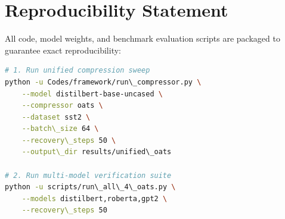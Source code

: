 \section{Reproducibility Statement}
All code, model weights, and benchmark evaluation scripts are packaged to guarantee exact reproducibility:
\begin{lstlisting}[language=bash]
# 1. Run unified compression sweep
python -u Codes/framework/run\_compressor.py \
    --model distilbert-base-uncased \
    --compressor oats \
    --dataset sst2 \
    --batch\_size 64 \
    --recovery\_steps 50 \
    --output\_dir results/unified\_oats

# 2. Run multi-model verification suite
python -u scripts/run\_all\_4\_oats.py \
    --models distilbert,roberta,gpt2 \
    --recovery\_steps 50
\end{lstlisting}
